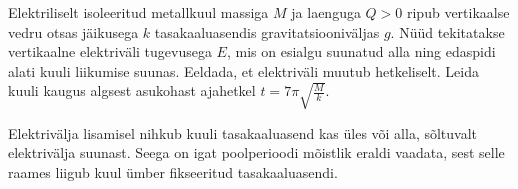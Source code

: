 
Elektriliselt isoleeritud metallkuul massiga $M$ ja laenguga $Q>0$ ripub vertikaalse vedru otsas jäikusega $k$ tasakaaluasendis gravitatsiooniväljas $g$. Nüüd tekitatakse vertikaalne elektriväli tugevusega $E$, mis on esialgu suunatud alla ning edaspidi alati kuuli liikumise suunas. Eeldada, et elektriväli muutub hetkeliselt. Leida kuuli kaugus algsest asukohast ajahetkel $t=7\pi \sqrt{\frac{M}{k}}$.

\hint
Elektrivälja lisamisel nihkub kuuli tasakaaluasend kas üles või alla, sõltuvalt elektrivälja suunast. Seega on igat poolperioodi mõistlik eraldi vaadata, sest selle raames liigub kuul ümber fikseeritud tasakaaluasendi.

